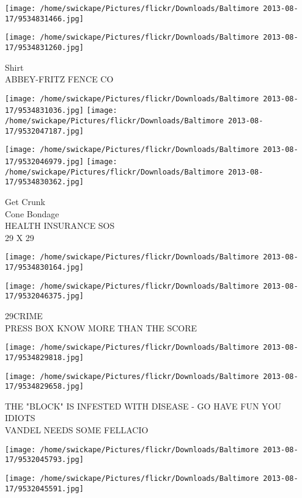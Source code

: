 \documentclass[10pt,letterpaper]{article}
\begin{document}
\texttt{[image: /home/swickape/Pictures/flickr/Downloads/Baltimore 2013-08-17/9534831466.jpg]}

\vspace{0.25in}
\texttt{[image: /home/swickape/Pictures/flickr/Downloads/Baltimore 2013-08-17/9534831260.jpg]}

Shirt\\
ABBEY{-}FRITZ FENCE CO
\pagebreak

\texttt{[image: /home/swickape/Pictures/flickr/Downloads/Baltimore 2013-08-17/9534831036.jpg]}
\texttt{[image: /home/swickape/Pictures/flickr/Downloads/Baltimore 2013-08-17/9532047187.jpg]}

\texttt{[image: /home/swickape/Pictures/flickr/Downloads/Baltimore 2013-08-17/9532046979.jpg]}
\texttt{[image: /home/swickape/Pictures/flickr/Downloads/Baltimore 2013-08-17/9534830362.jpg]}

Get Crunk\\
Cone Bondage\\
HEALTH INSURANCE SOS\\
29 X 29
\pagebreak

\texttt{[image: /home/swickape/Pictures/flickr/Downloads/Baltimore 2013-08-17/9534830164.jpg]}

\vspace{0.25in}
\texttt{[image: /home/swickape/Pictures/flickr/Downloads/Baltimore 2013-08-17/9532046375.jpg]}

29CRIME\\
PRESS BOX KNOW MORE THAN THE SCORE
\pagebreak

\texttt{[image: /home/swickape/Pictures/flickr/Downloads/Baltimore 2013-08-17/9534829818.jpg]}

\vspace{0.25in}
\texttt{[image: /home/swickape/Pictures/flickr/Downloads/Baltimore 2013-08-17/9534829658.jpg]}

THE "BLOCK" IS INFESTED WITH DISEASE {-} GO HAVE FUN YOU IDIOTS\\
VANDEL NEEDS SOME FELLACIO
\pagebreak

\texttt{[image: /home/swickape/Pictures/flickr/Downloads/Baltimore 2013-08-17/9532045793.jpg]}

\vspace{0.25in}
\texttt{[image: /home/swickape/Pictures/flickr/Downloads/Baltimore 2013-08-17/9532045591.jpg]}
\end{document}
